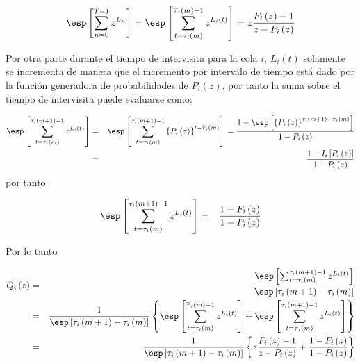 \begin{eqnarray}\label{Eq.Arribos.Primera}
\esp\left[\sum_{n=0}^{T-1}z^{L_{n}}\right]=
\esp\left[\sum_{t=\tau_{i}\left(m\right)}^{\overline{\tau}_{i}\left(m\right)-1}z^{L_{i}\left(t\right)}\right]
=z\frac{F_{i}\left(z\right)-1}{z-P_{i}\left(z\right)}
\end{eqnarray}

Por otra parte durante el tiempo de intervisita para la cola $i$, $L_{i}\left(t\right)$ solamente se incrementa de manera que el incremento por intervalo de tiempo est\'a dado por la funci\'on generadora de probabilidades de $P_{i}\left(z\right)$, por tanto la suma sobre el tiempo de intervisita puede evaluarse como:

\begin{eqnarray*}
\esp\left[\sum_{t=\tau_{i}\left(m\right)}^{\tau_{i}\left(m+1\right)-1}z^{L_{i}\left(t\right)}\right]&=&\esp\left[\sum_{t=\tau_{i}\left(m\right)}^{\tau_{i}\left(m+1\right)-1}\left\{P_{i}\left(z\right)\right\}^{t-\overline{\tau}_{i}\left(m\right)}\right]=\frac{1-\esp\left[\left\{P_{i}\left(z\right)\right\}^{\tau_{i}\left(m+1\right)-\overline{\tau}_{i}\left(m\right)}\right]}{1-P_{i}\left(z\right)}\\
&=&\frac{1-I_{i}\left[P_{i}\left(z\right)\right]}{1-P_{i}\left(z\right)}
\end{eqnarray*}
por tanto

\begin{eqnarray*}
\esp\left[\sum_{t=\tau_{i}\left(m\right)}^{\tau_{i}\left(m+1\right)-1}z^{L_{i}\left(t\right)}\right]&=&
\frac{1-F_{i}\left(z\right)}{1-P_{i}\left(z\right)}
\end{eqnarray*}

Por lo tanto

\begin{eqnarray*}
Q_{i}\left(z\right)&=&\frac{\esp\left[\sum_{t=\tau_{i}\left(m\right)}^{\tau_{i}
\left(m+1\right)-1}z^{L_{i}\left(t\right)}\right]}{\esp\left[\tau_{i}\left(m+1\right)-\tau_{i}\left(m\right)\right]}\\
&=&\frac{1}{\esp\left[\tau_{i}\left(m+1\right)-\tau_{i}\left(m\right)\right]}
\left\{
\esp\left[\sum_{t=\tau_{i}\left(m\right)}^{\overline{\tau}_{i}\left(m\right)-1}
z^{L_{i}\left(t\right)}\right]
+\esp\left[\sum_{t=\overline{\tau}_{i}\left(m\right)}^{\tau_{i}\left(m+1\right)-1}
z^{L_{i}\left(t\right)}\right]\right\}\\
&=&\frac{1}{\esp\left[\tau_{i}\left(m+1\right)-\tau_{i}\left(m\right)\right]}
\left\{
z\frac{F_{i}\left(z\right)-1}{z-P_{i}\left(z\right)}+\frac{1-F_{i}\left(z\right)}
{1-P_{i}\left(z\right)}
\right\}
\end{eqnarray*}


